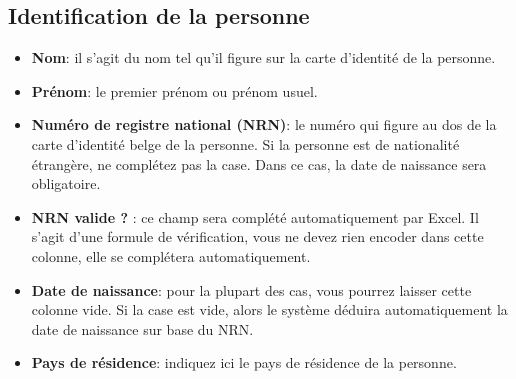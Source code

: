 \subsection{Identification de la personne}
\begin{itemize}
    \item \textbf{Nom}: il s'agit du nom tel qu'il figure sur la carte d'identité de la personne. 
    \item \textbf{Prénom}: le premier prénom ou prénom usuel. 
    \item \textbf{Numéro de registre national (NRN)}: le numéro qui figure au dos de la carte d'identité belge de la personne. Si la personne est de nationalité étrangère, ne complétez pas la case. Dans ce cas, la date de naissance sera obligatoire.
    \item \textbf{NRN valide ?} : ce champ sera complété automatiquement par Excel. Il s'agit d'une formule de vérification, vous ne devez rien encoder dans cette colonne, elle se complétera automatiquement.
    \item \textbf{Date de naissance}: pour la plupart des cas, vous pourrez laisser cette colonne vide. Si la case est vide, alors le système déduira automatiquement la date de naissance sur base du NRN. 
    \item \textbf{Pays de résidence}: indiquez ici le pays de résidence de la personne.
\end{itemize}

